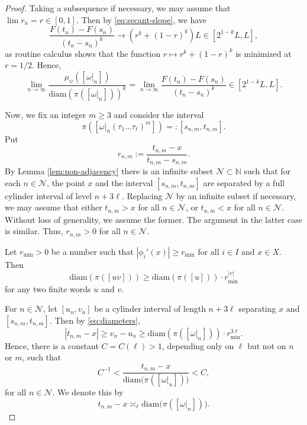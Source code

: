\documentclass[10pt,a4paper]{amsart}
\newcommand\NN{\mathbb{N}}
\newcommand\diam{\mathrm{diam}}
\begin{document}
\begin{proof}
Taking a subsequence if necessary, we may assume that $\lim r_{n}=r\in[0,1]$.
Then by \eqref{eq:secant-slope}, we have
\[
\frac{F(t_{n})-F(s_{n})}{(t_{n}-s_{n})^{k}}\rightarrow\left(r^{k}+(1-r)^{k}\right)L\in\left[2^{1-k}L,L\right],
\]
as routine calculus shows that the function $r\mapsto r^k+(1-r)^k$ is minimized at $r=1/2$.
Hence,
\begin{equation} \label{eq:bounded-ratio}
\lim_{n\rightarrow\infty}\frac{\mu_\psi\left(\left[\omega|_{n}\right]\right)}{\diam\left(\pi\left(\left[\omega|_{n}\right]\right)\right)^{k}}=\lim_{n\rightarrow\infty}\frac{F(t_{n})-F(s_{n})}{(t_{n}-s_{n})^{k}}\in\left[2^{1-k}L,L\right]. %
\end{equation}

Now, we fix an integer {$m\geq 3$} and consider the interval
\[
\pi\left(\left[\omega|_{n}(\tau_{1}\dots \tau_{\ell})^{m}\right]\right)=:\left[s_{n,m},t_{n,m}\right].
\]
Put
\[
r_{n,m}:=\frac{t_{n,m}-x}{t_{n,m}-s_{n,m}}.
\]
By Lemma \ref{lem:non-adjacency} there is an infinite subset $\mathcal{N}\subset\NN$ such that for each $n\in\mathcal{N}$, the point $x$ and the interval $[s_{n,m},t_{n,m}]$ are separated by a full cylinder interval of level $n+3\ell$. 
Replacing $\mathcal{N}$ by an infinite subset if necessary, we may assume that either $t_{n,m}>x$ for all $n\in \mathcal{N}$, or $t_{n,m}<x$ for all $n\in \mathcal{N}$. Without loss of generality, we assume the former. The argument in the latter case is similar. Thus, $r_{n,m}>0$ for all $n\in\mathcal{N}$.

Let $r_{\min}>0$ be a number such that $|\phi_i'(x)|\geq r_{\min}$ for all $i\in I$ and $x\in X$. Then
\begin{equation} \label{eq:diameters}
\diam (\pi([uv]))\geq \diam (\pi([u]))\cdot r_{\min}^{|v|}
\end{equation}
for any two finite words $u$ and $v$.

For $n\in\mathcal{N}$, let $[u_n,v_n]$ be a cylinder interval of length $n+3\ell$ separating $x$ and $[s_{n,m},t_{n,m}]$. Then by \eqref{eq:diameters},
\[
|t_{n,m}-x|\geq v_n-u_n\geq \diam (\pi([\omega|_n]))\cdot r_{\min}^{3\ell}.
\]
Hence, there is a constant $C=C(\ell)>1$, depending only on $\ell$ but not on $n$ or $m$, such that
\[
C^{-1}<\frac{t_{n,m}-x}{\diam\big(\pi\left(\left[\omega|_{n}\right]\right)\big)}<C,
\]
for all $n\in\mathcal{N}$. We denote this by
\begin{equation} \label{eq:comparable}
t_{n,m}-x\asymp_\ell\diam\big(\pi\left(\left[\omega|_{n}\right]\right)\big). 
\end{equation}


\end{proof}
\end{document}
